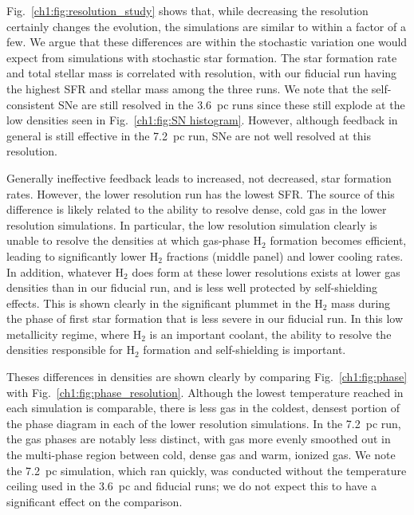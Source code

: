Fig.~\ref{ch1:fig:resolution_study} shows that, while decreasing the resolution certainly changes the evolution, the simulations are similar to within a factor of a few. We argue that these differences are within the stochastic variation one would expect from simulations with stochastic star formation. The star formation rate and total stellar mass is correlated with resolution, with our fiducial run having the highest SFR and stellar mass among the three runs. We note that the self-consistent SNe are still resolved in the 3.6~pc runs since these still explode at the low densities seen in Fig.~\ref{ch1:fig:SN histogram}. However, although feedback in general is still effective in the 7.2~pc run, SNe are not well resolved at this resolution.

Generally ineffective feedback leads to increased, not decreased, star formation rates. However, the lower resolution run has the lowest SFR. The source of this difference is likely related to the ability to resolve dense, cold gas in the lower resolution simulations. In particular, the low resolution simulation clearly is unable to resolve the densities at which gas-phase H$_2$ formation becomes efficient, leading to significantly lower H$_2$ fractions (middle panel) and lower cooling rates. In addition, whatever H$_2$ does form at these lower resolutions exists at lower gas densities than in our fiducial run, and is less well protected by self-shielding effects. This is shown clearly in the significant plummet in the H$_2$ mass during the phase of first star formation that is less severe in our fiducial run. In this low metallicity regime, where H$_2$ is an important coolant, the ability to resolve the densities responsible for H$_2$ formation and self-shielding is important.

Theses differences in densities are shown clearly by comparing Fig.~\ref{ch1:fig:phase} with Fig.~\ref{ch1:fig:phase_resolution}. Although the lowest temperature reached in each simulation is comparable, there is less gas in the coldest, densest portion of the phase diagram in each of the lower resolution simulations. In the 7.2~pc run, the gas phases are notably less distinct, with gas more evenly smoothed out in the multi-phase region between cold, dense gas and warm, ionized gas. We note the 7.2~pc simulation, which ran quickly, was conducted without the temperature ceiling used in the 3.6~pc and fiducial runs; we do not expect this to have a significant effect on the comparison.


